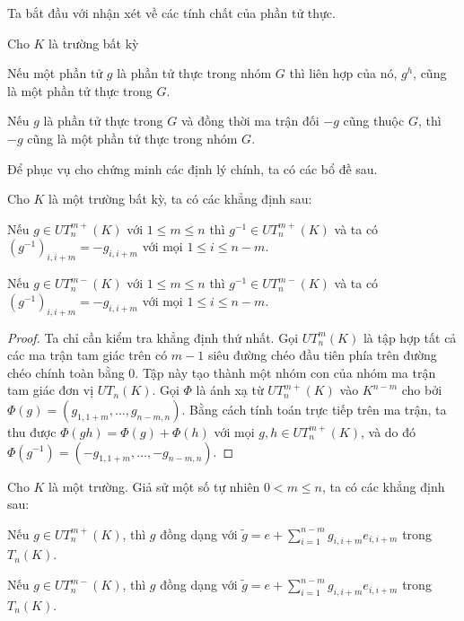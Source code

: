Ta bắt đầu với nhận xét về các tính chất của phần tử thực.

\begin{rem}\label{rem:nhanxet1}
Cho $K$ là trường bất kỳ
\begin{thmenum}
    \item Nếu một phần tử $g$ là phần tử thực trong nhóm $G$ thì liên hợp của nó, $g^h$, cũng là một phần tử thực trong $G$.
    \item Nếu $g$ là phần tử thực trong $G$ và đồng thời ma trận đối $-g$ cũng thuộc $G$, thì $-g$ cũng là một phần tử thực trong nhóm $G$.
\end{thmenum}
\end{rem}

Để phục vụ cho chứng minh các định lý chính, ta có các bổ đề sau.

\begin{lem}\label{lem:bode2.1}
Cho $K$ là một trường bất kỳ, ta có các khẳng định sau:
\begin{thmenum}
    \item Nếu $g\in UT_{n}^{m+}(K)$ với $1\le m\le n$ thì $g^{-1}\in UT_{n}^{m+}(K)$ và ta có $(g^{-1})_{i, i+m} = -g_{i, i+m}$ với mọi $1\leq i\leq n-m$.
    \item Nếu $g\in UT_{n}^{m-}(K)$ với $1\le m\le n$ thì $g^{-1}\in UT_{n}^{m-}(K)$ và ta có $(g^{-1})_{i, i+m} = -g_{i, i+m}$ với mọi $1\leq i\leq n-m$.
\end{thmenum}
\end{lem}

\begin{proof}
Ta chỉ cần kiểm tra khẳng định thứ nhất. Gọi $UT_n^m(K)$ là tập hợp tất cả các ma trận tam giác trên có $m-1$ siêu đường chéo đầu tiên phía trên đường chéo chính toàn bằng $0$. Tập này tạo thành một nhóm con của nhóm ma trận tam giác đơn vị $UT_n(K)$. Gọi $\Phi$ là ánh xạ từ $UT_n^{m+}(K)$ vào $K^{n-m}$ cho bởi $\Phi(g)=(g_{1,1+m},\dots,g_{n-m,n})$.
Bằng cách tính toán trực tiếp trên ma trận, ta thu được $\Phi(gh)=\Phi(g)+\Phi(h)$ với mọi $g,h\in UT_n^{m+}(K)$, và do đó $\Phi(g^{-1}) = (-g_{1,1+m},\dots,-g_{n-m,n})$.
\end{proof}

\begin{lem}\label{lem:bode2.2}
Cho $K$ là một trường. Giả sử một số tự nhiên $0<m\le n$, ta có các khẳng định sau:
\begin{thmenum}
    \item Nếu $g\in UT_{n}^{m+}(K)$, thì $g$ đồng dạng với $\tilde{g} = e + \sum_{i=1}^{n-m} g_{i, i+m} e_{i, i+m}$ trong $T_n(K)$.
    \item Nếu $g\in UT_{n}^{m-}(K)$, thì $g$ đồng dạng với $\tilde{g} = e + \sum_{i=1}^{n-m} g_{i, i+m} e_{i, i+m}$ trong $T_n(K)$.
\end{thmenum}
\end{lem}

